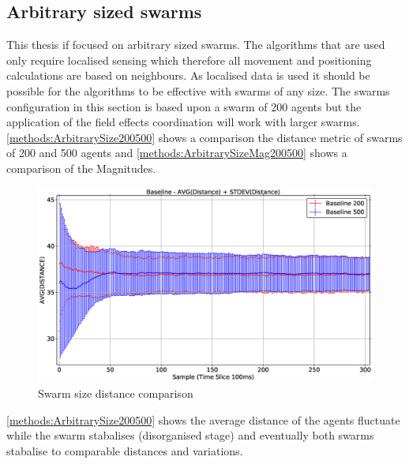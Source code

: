 \subsection{Arbitrary sized swarms}\label{section:arbitrary}
This thesis if focused on arbitrary sized swarms. The algorithms that are used only require localised sensing which therefore all movement and positioning calculations are based on neighbours. As localised data is used it should be possible for the algorithms to be effective with swarms of any size. The swarms configuration in this section is based upon a swarm of 200 agents but the application of the field effects coordination will work with larger swarms. \autoref{methods:ArbitrarySize200500} shows a comparison the distance metric of swarms of 200 and 500 agents and \autoref{methods:ArbitrarySizeMag200500} shows a comparison of the Magnitudes.

\begin{figure}[H]
\begin{center}
\includegraphics[width=13cm]{CHAPTER-5/figures/ArbitrarySize200500}
\end{center}
\caption{Swarm size distance comparison\label{methods:ArbitrarySize200500}}
\end{figure}

\autoref{methods:ArbitrarySize200500} shows the average distance of the agents fluctuate while the swarm stabalises (disorganised stage) and eventually both swarms stabalise to comparable distances and variations. 

